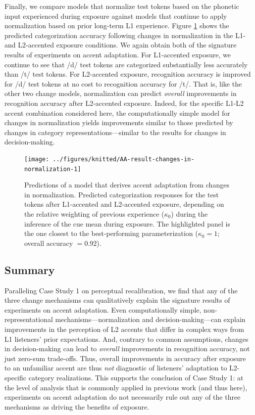\documentclass[
  11pt,
  man,floatsintext]{apa6}
\begin{document}
Finally, we compare models that normalize test tokens based on the phonetic input experienced during exposure against models that continue to apply normalization based on prior long-term L1 experience. Figure \ref{fig:AA-result-changes-in-normalization} shows the predicted categorization accuracy following changes in normalization in the L1- and L2-accented exposure conditions. We again obtain both of the signature results of experiments on accent adaptation. For L1-accented exposure, we continue to see that /d/ test tokens are categorized substantially less accurately than /t/ test tokens. For L2-accented exposure, recognition accuracy is improved for /d/ test tokens at no cost to recognition accuracy for /t/. That is, like the other two change models, normalization can predict \emph{overall} improvements in recognition accuracy after L2-accented exposure. Indeed, for the specific L1-L2 accent combination considered here, the computationally simple model for changes in normalization yields improvements similar to those predicted by changes in category representations---similar to the results for changes in decision-making.



\begin{figure}

{\centering \texttt{[image: ../figures/knitted/AA-result-changes-in-normalization-1]} 

}

\caption{Predictions of a model that derives accent adaptation from changes in normalization. Predicted categorization responses for the test tokens after L1-accented and L2-accented exposure, depending on the relative weighting of previous experience (\(\kappa_0\)) during the inference of the cue mean during exposure. The highlighted panel is the one closest to the best-performing parameterization (\(\kappa_0 = 1\); overall accuracy \(=0.92\)).}\label{fig:AA-result-changes-in-normalization}
\end{figure}

\hypertarget{summary-1}{%
\subsection{Summary}\label{summary-1}}

Paralleling Case Study 1 on perceptual recalibration, we find that any of the three change mechanisms can qualitatively explain the signature results of experiments on accent adaptation. Even computationally simple, non-representational mechanisms---normalization and decision-making---can explain improvements in the perception of L2 accents that differ in complex ways from L1 listeners' prior expectations. And, contrary to common assumptions, changes in decision-making can lead to \emph{overall} improvements in recognition accuracy, not just zero-sum trade-offs. Thus, overall improvements in accuracy after exposure to an unfamiliar accent are thus \emph{not} diagnostic of listeners' adaptation to L2-specific category realizations. This supports the conclusion of Case Study 1: at the level of analysis that is commonly applied in previous work (and thus here), experiments on accent adaptation do not necessarily rule out any of the three mechanisms as driving the benefits of exposure.
\end{document}
